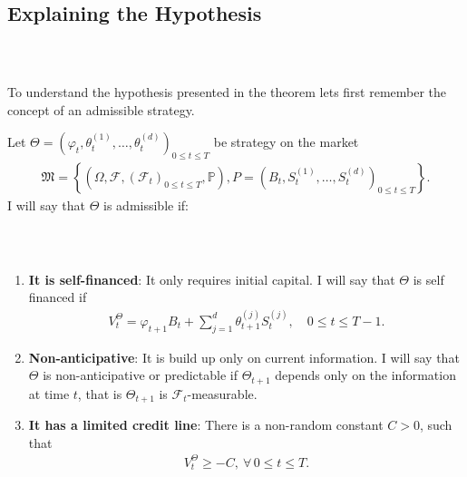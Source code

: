 \documentclass{beamer}
\numberwithin{equation}{section}
\begin{document}
\subsection{Explaining the Hypothesis}

\begin{frame}\frametitle{{\normalsize \secname} \\ {\large \subsecname}}
    To understand the hypothesis presented in the theorem lets first remember the concept of an admissible strategy.
    \begin{definition}
        Let $\Theta = \left(\varphi_t, \theta_t^{(1)}, \ldots, \theta_t^{(d)}\right)_{0 \leq t \leq T}$ be strategy on the market
        \begingroup
        \footnotesize
        \begin{align}
            \mathfrak{M} =
            \left\{
                \left(
                    \Omega,
                    \mathscr{F},
                    \left(
                        \mathscr{F}_t
                    \right)_{0 \leq t \leq T},
                    \mathbb{P}
                \right),
                P =
                \left(
                    B_t,
                    S_t^{(1)},
                    \ldots,
                    S_t^{(d)}
                \right)_{0 \leq t \leq T}
            \right\}.
        \end{align}
        \endgroup
        I will say that $\Theta$ is admissible if:
    \end{definition}
\end{frame}

\begin{frame}\frametitle{{\normalsize \secname} \\ {\large \subsecname}}
    \begin{enumerate}
        \item \textbf{It is self-financed}: It only requires initial capital.
        I will say that $\Theta$ is self financed if
        \begin{align}
            V_t^{\Theta} = \varphi_{t+1}B_t + \sum_{j=1}^d \theta_{t+1}^{(j)}S_t^{(j)}, \quad 0 \leq t \leq T-1.
        \end{align}
        \item \textbf{Non-anticipative}: It is build up only on current information.
        I will say that $\Theta$ is non-anticipative or predictable if $\Theta_{t+1}$ depends only on the information at time $t$, that is $\Theta_{t+1}$ is $\mathscr{F}_t$-measurable.
        \item \textbf{It has a limited credit line}: There is a non-random constant $C > 0$, such that
        \begin{align}
            V_t^{\Theta} \geq -C, \ \forall \, 0 \leq t \leq T.
        \end{align}
    \end{enumerate}
\end{frame}
\end{document}
